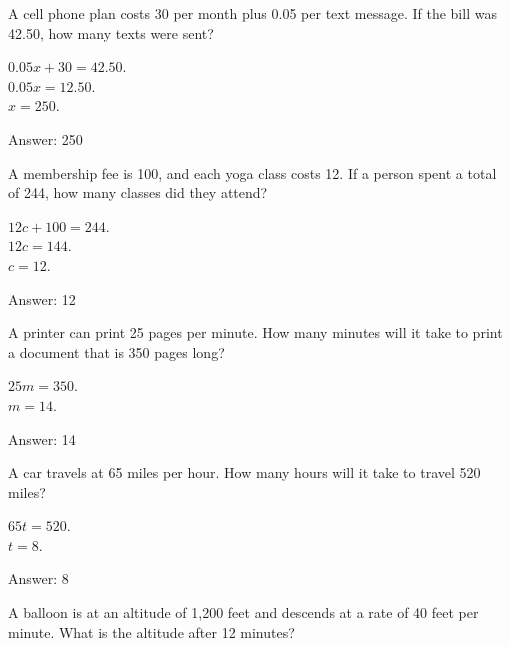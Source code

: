 \documentclass[11pt,paper=a4,answers]{exam}
\begin{document}
\begin{questions}
\question
A cell phone plan costs 30 per month plus 0.05 per text message. If the bill was 42.50, how many texts were sent?

\begin{solution}
$0.05x + 30 = 42.50$. 
\\[10pt]
$0.05x = 12.50$. 
\\[10pt]
$x = 250$.

\vspace{20pt}
Answer: \colorbox{yellow!100}{250}
\end{solution}

\question
A membership fee is 100, and each yoga class costs 12. If a person spent a total of 244, how many classes did they attend?

\begin{solution}
$12c + 100 = 244$. 
\\[10pt]
$12c = 144$. 
\\[10pt]
$c = 12$.

\vspace{20pt}
Answer: \colorbox{yellow!100}{12}
\end{solution}

\question
A printer can print 25 pages per minute. How many minutes will it take to print a document that is 350 pages long?

\begin{solution}
$25m = 350$. 
\\[10pt]
$m = 14$.

\vspace{20pt}
Answer: \colorbox{yellow!100}{14}
\end{solution}

\question
A car travels at 65 miles per hour. How many hours will it take to travel 520 miles?

\begin{solution}
$65t = 520$. 
\\[10pt]
$t = 8$.

\vspace{20pt}
Answer: \colorbox{yellow!100}{8}
\end{solution}

\question
A balloon is at an altitude of 1,200 feet and descends at a rate of 40 feet per minute. What is the altitude after 12 minutes?


\end{questions}
\end{document}
